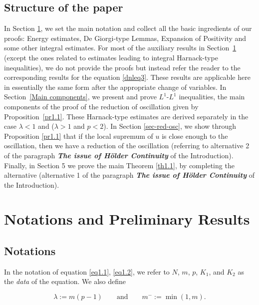 \documentclass[a4paper,11pt,fullpage]{article}
\numberwithin{equation}{section}
\begin{document}
\subsection{Structure of the paper} In Section \ref{prelim}, we set the main notation and collect all the basic ingredients of our proofs: Energy estimates, De Giorgi-type Lemmas, Expansion of Positivity  and some other integral estimates. For most of the auxiliary results in Section~\ref{prelim} (except the ones related to estimates leading to integral Harnack-type inequalities), we do not provide the proofs but instead refer the reader to the corresponding results for the equation \eqref{dnleq3}.
These results are applicable here in essentially the same form after the appropriate change of variables. In Section~\ref{Main components}, we present and prove $L^1$-$L^1$ inequalities, the main components of the proof of the reduction of oscillation given by Proposition~\ref{pr1.1}. These Harnack-type estimates are derived separately in the case $\lambda<1$ and ($\lambda>1$ and $ p<2$). In Section \ref{sec-red-osc}, we show through Proposition \ref{pr1.1} that if the local supremum of $u$ is close enough to the oscillation, then we have a reduction of the oscillation (referring to alternative 2 of the paragraph {\bf {\it The issue of H\"older Continuity}} of the Introduction). Finally, in Section 5 we prove the main Theorem \eqref{th1.1}, by completing the alternative (alternative 1 of the paragraph {\bf {\it The issue of H\"older Continuity}} of the Introduction). 












\section{Notations and Preliminary Results}\label{prelim}  



\subsection{Notations}

In the notation of equation \eqref{eq1.1}, \eqref{eq1.2}, we refer to
$N$, $m$, $p$, $K_1$, and $K_2$ as the {\it data} of the equation. We also define

\begin{equation*}
\lambda :=m(p-1) \qquad  \mathrm{and} \qquad m^-:=\min(1,m).
\end{equation*}
\end{document}
